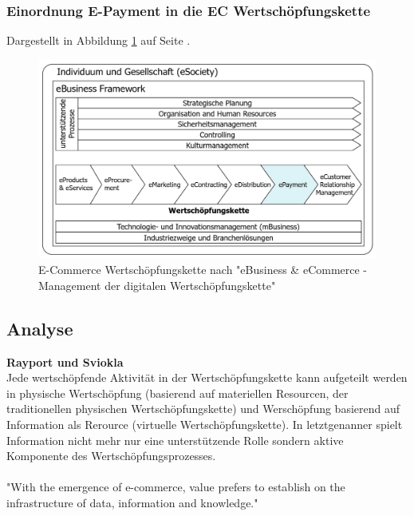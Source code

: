 \subsubsection{Einordnung E-Payment in die EC Wertschöpfungskette}
Dargestellt in Abbildung \ref{fig:ecvc_01} auf Seite \pageref{fig:ecvc_01}.
\begin{figure}[htb]
\centering
\includegraphics[width=\textwidth]{img/value_chain_ec2.png}
\caption{E-Commerce Wertschöpfungskette nach "eBusiness \& eCommerce - Management der digitalen Wertschöpfungskette"}
\label{fig:ecvc_01}
\end{figure}
\subsection{Analyse}
\textbf{Rayport und Sviokla}\\
Jede wertschöpfende Aktivität in der Wertschöpfungskette kann aufgeteilt werden in physische Wertschöpfung (basierend auf materiellen Resourcen, der traditionellen physischen Wertschöpfungskette) und Werschöpfung basierend auf Information als Rerource (virtuelle Wertschöpfungskette). In letztgenanner spielt Information nicht mehr nur eine unterstützende Rolle sondern aktive Komponente des Wertschöpfungsprozesses.\\
\\
"With the emergence of e-commerce, value prefers to establish on the infrastructure of data, information and knowledge."

